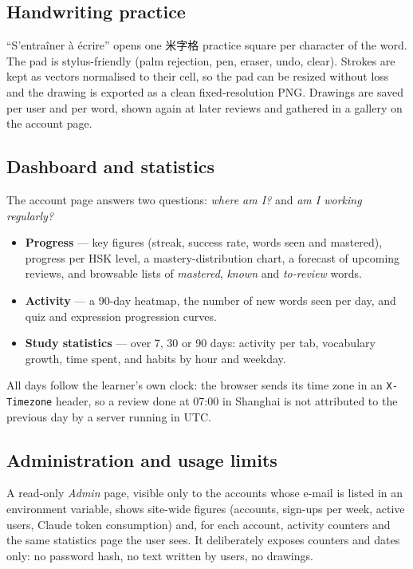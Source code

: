 \documentclass[11pt,a4paper]{article}
\newcommand{\han}[1]{{#1}}
\begin{document}
\subsection{Handwriting practice}

``S'entraîner à écrire'' opens one \han{米字格} practice square per character of
the word. The pad is stylus-friendly (palm rejection, pen, eraser, undo,
clear). Strokes are kept as vectors normalised to their cell, so the pad can be
resized without loss and the drawing is exported as a clean fixed-resolution
PNG. Drawings are saved per user and per word, shown again at later reviews and
gathered in a gallery on the account page.

\subsection{Dashboard and statistics}

The account page answers two questions: \emph{where am I?} and \emph{am I
working regularly?}

\begin{itemize}
  \item \textbf{Progress} --- key figures (streak, success rate, words seen and
        mastered), progress per HSK level, a mastery-distribution chart, a
        forecast of upcoming reviews, and browsable lists of \emph{mastered},
        \emph{known} and \emph{to-review} words.
  \item \textbf{Activity} --- a 90-day heatmap, the number of new words seen
        per day, and quiz and expression progression curves.
  \item \textbf{Study statistics} --- over 7, 30 or 90 days: activity per tab,
        vocabulary growth, time spent, and habits by hour and weekday.
\end{itemize}

All days follow the learner's own clock: the browser sends its time zone in an
\texttt{X-Timezone} header, so a review done at 07:00 in Shanghai is not
attributed to the previous day by a server running in UTC.

\subsection{Administration and usage limits}

A read-only \emph{Admin} page, visible only to the accounts whose e-mail is
listed in an environment variable, shows site-wide figures (accounts, sign-ups
per week, active users, Claude token consumption) and, for each account,
activity counters and the same statistics page the user sees. It deliberately
exposes counters and dates only: no password hash, no text written by users, no
drawings.
\end{document}
